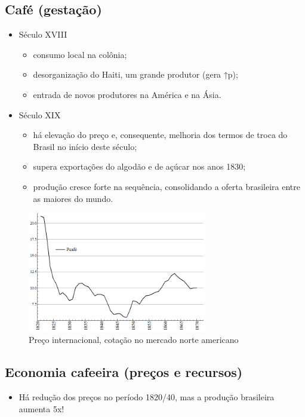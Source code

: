 \documentclass[a4paper,12pt]{article}[abntex2]
\begin{document}
\subsection{\textbf{Café (gestação)}}
\begin{itemize}
    \item Século XVIII 
    \begin{itemize}
        \item consumo local na colônia;
        \item desorganização do Haiti, um grande produtor (gera ↑p);
        \item entrada de novos produtores na América e na Ásia.
    \end{itemize}
    \item Século XIX 
    \begin{itemize}
        \item há elevação do preço e, consequente, melhoria dos termos de troca do Brasil no início deste século;
\item supera exportações do algodão e de açúcar nos anos 1830;
\item produção cresce forte na sequência, consolidando a oferta brasileira entre as maiores do mundo.
    \end{itemize}
\end{itemize}

\begin{figure}[H]
    \centering
    \includegraphics[width=0.7\textwidth]{Imagens Slides/i1a7.png}
    \caption{Preço internacional, cotação no mercado norte americano}
\end{figure}

\subsection{\textbf{Economia cafeeira (preços e recursos)}}
\begin{itemize}
    \item Há redução dos preços no período 1820/40, mas a produção brasileira aumenta 5x!

\end{itemize}
\end{document}
